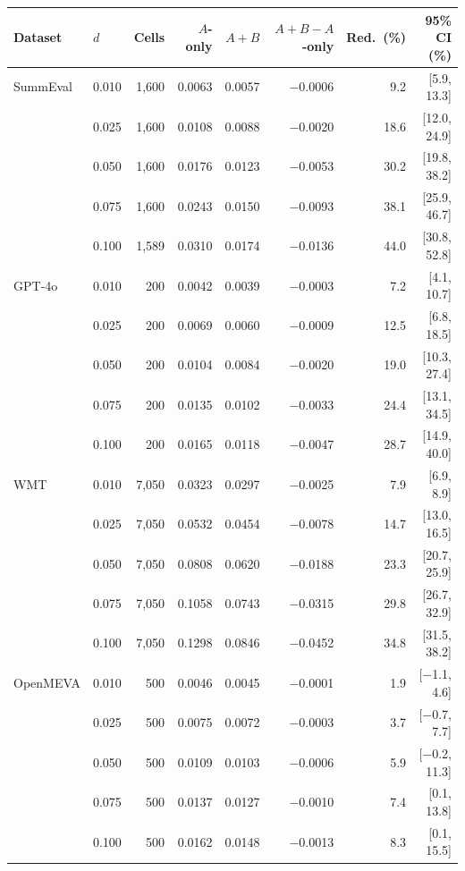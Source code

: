 \begin{tabular}{llrrrrrr}
\toprule
Dataset & $d$ & Cells & $A$-only & $A{+}B$ & $A{+}B-A$-only & Red.\ (\%) & 95\% CI (\%) \\
\midrule
SummEval & 0.010 & 1,600 & 0.0063 & 0.0057 & $-$0.0006 & 9.2 & [5.9, 13.3] \\
 & 0.025 & 1,600 & 0.0108 & 0.0088 & $-$0.0020 & 18.6 & [12.0, 24.9] \\
 & 0.050 & 1,600 & 0.0176 & 0.0123 & $-$0.0053 & 30.2 & [19.8, 38.2] \\
 & 0.075 & 1,600 & 0.0243 & 0.0150 & $-$0.0093 & 38.1 & [25.9, 46.7] \\
 & 0.100 & 1,589 & 0.0310 & 0.0174 & $-$0.0136 & 44.0 & [30.8, 52.8] \\
\midrule
GPT-4o & 0.010 & 200 & 0.0042 & 0.0039 & $-$0.0003 & 7.2 & [4.1, 10.7] \\
 & 0.025 & 200 & 0.0069 & 0.0060 & $-$0.0009 & 12.5 & [6.8, 18.5] \\
 & 0.050 & 200 & 0.0104 & 0.0084 & $-$0.0020 & 19.0 & [10.3, 27.4] \\
 & 0.075 & 200 & 0.0135 & 0.0102 & $-$0.0033 & 24.4 & [13.1, 34.5] \\
 & 0.100 & 200 & 0.0165 & 0.0118 & $-$0.0047 & 28.7 & [14.9, 40.0] \\
\midrule
WMT & 0.010 & 7,050 & 0.0323 & 0.0297 & $-$0.0025 & 7.9 & [6.9, 8.9] \\
 & 0.025 & 7,050 & 0.0532 & 0.0454 & $-$0.0078 & 14.7 & [13.0, 16.5] \\
 & 0.050 & 7,050 & 0.0808 & 0.0620 & $-$0.0188 & 23.3 & [20.7, 25.9] \\
 & 0.075 & 7,050 & 0.1058 & 0.0743 & $-$0.0315 & 29.8 & [26.7, 32.9] \\
 & 0.100 & 7,050 & 0.1298 & 0.0846 & $-$0.0452 & 34.8 & [31.5, 38.2] \\
\midrule
OpenMEVA & 0.010 & 500 & 0.0046 & 0.0045 & $-$0.0001 & 1.9 & [$-$1.1, 4.6] \\
 & 0.025 & 500 & 0.0075 & 0.0072 & $-$0.0003 & 3.7 & [$-$0.7, 7.7] \\
 & 0.050 & 500 & 0.0109 & 0.0103 & $-$0.0006 & 5.9 & [$-$0.2, 11.3] \\
 & 0.075 & 500 & 0.0137 & 0.0127 & $-$0.0010 & 7.4 & [0.1, 13.8] \\
 & 0.100 & 500 & 0.0162 & 0.0148 & $-$0.0013 & 8.3 & [0.1, 15.5] \\
\bottomrule
\end{tabular}
